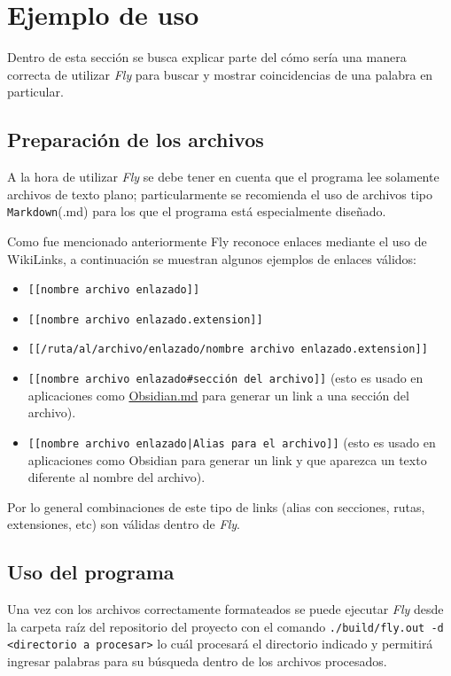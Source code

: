\section{Ejemplo de uso}

Dentro de esta sección se busca explicar parte del cómo sería una manera correcta de utilizar \textit{Fly} para buscar y mostrar coincidencias de una palabra en particular.

\subsection{Preparación de los archivos}
A la hora de utilizar \textit{Fly} se debe tener en cuenta que el programa lee solamente archivos de texto plano; particularmente se recomienda el uso de archivos tipo \texttt{Markdown}(.md) para los que el programa está especialmente diseñado.

Como fue mencionado anteriormente Fly reconoce enlaces mediante el uso de WikiLinks, a continuación se muestran algunos ejemplos de enlaces válidos:
\begin{itemize}
    \item \texttt{[[nombre archivo enlazado]]}
    \item \texttt{[[nombre archivo enlazado.extension]]}
    \item \texttt{[[/ruta/al/archivo/enlazado/nombre archivo enlazado.extension]]}
    \item \texttt{[[nombre archivo enlazado\#sección del archivo]]} (esto es usado en aplicaciones como \href{https://obsidian.md/}{Obsidian.md} para generar un link a una sección del archivo).
    \item \texttt{[[nombre archivo enlazado|Alias para el archivo]]} (esto es usado en aplicaciones como Obsidian para generar un link y que aparezca un texto diferente al nombre del archivo).
\end{itemize}

Por lo general combinaciones de este tipo de links (alias con secciones, rutas, extensiones, etc) son válidas dentro de \textit{Fly}.

\subsection{Uso del programa}
Una vez con los archivos correctamente formateados se puede ejecutar \textit{Fly} desde la carpeta raíz del repositorio del proyecto con el comando \texttt{./build/fly.out -d <directorio a procesar>} lo cuál procesará el directorio indicado y permitirá ingresar palabras para su búsqueda dentro de los archivos procesados.


